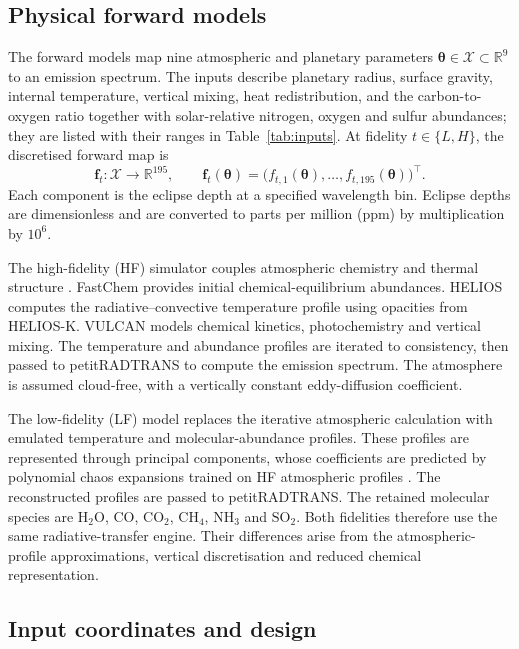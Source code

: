 \documentclass[12pt, letterpaper, oneside]{article}
\begin{document}
\subsection{Physical forward models}

The forward models map nine atmospheric and planetary parameters
$\bm\theta\in\mathcal{X}\subset\mathbb{R}^{9}$ to an emission spectrum. The
inputs describe planetary radius, surface gravity, internal temperature,
vertical mixing, heat redistribution, and the carbon-to-oxygen ratio together
with solar-relative nitrogen, oxygen and sulfur abundances; they are listed
with their ranges in Table~\ref{tab:inputs}. At fidelity $t\in\{L,H\}$, the
discretised forward map is
\[
    \mathbf{f}_t:\mathcal{X}\longrightarrow\mathbb{R}^{195},
    \qquad
    \mathbf{f}_t(\bm\theta)
    =\bigl(f_{t,1}(\bm\theta),\ldots,
           f_{t,195}(\bm\theta)\bigr)^\top.
\]
Each component is the eclipse depth at a specified wavelength bin. Eclipse
depths are dimensionless and are converted to parts per million (ppm) by
multiplication by $10^6$.

The high-fidelity (HF) simulator couples atmospheric chemistry and thermal
structure \citep{Nussbaumer2026}. FastChem provides initial
chemical-equilibrium abundances. HELIOS computes the radiative--convective
temperature profile using opacities from HELIOS-K. VULCAN models chemical
kinetics, photochemistry and vertical mixing. The temperature and abundance
profiles are iterated to consistency, then passed to petitRADTRANS to compute
the emission spectrum. The atmosphere is assumed cloud-free, with a
vertically constant eddy-diffusion coefficient.

The low-fidelity (LF) model replaces the iterative atmospheric calculation
with emulated temperature and molecular-abundance profiles. These profiles are
represented through principal components, whose coefficients are predicted by
polynomial chaos expansions trained on HF atmospheric profiles
\citep{Nussbaumer2026}. The reconstructed profiles are passed to
petitRADTRANS. The retained molecular species are
$\mathrm{H_2O}$, $\mathrm{CO}$, $\mathrm{CO_2}$, $\mathrm{CH_4}$,
$\mathrm{NH_3}$ and $\mathrm{SO_2}$. Both fidelities therefore use the same
radiative-transfer engine. Their differences arise from the
atmospheric-profile approximations, vertical discretisation and reduced
chemical representation.

\subsection{Input coordinates and design}
\end{document}
